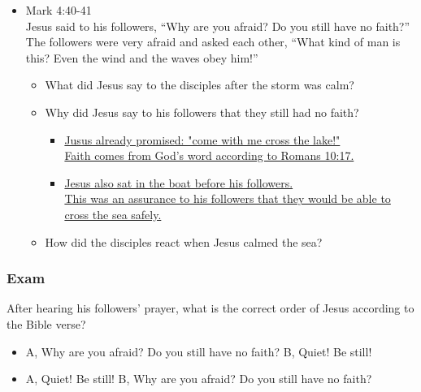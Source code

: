 \begin{itemize}
\item Mark 4:40-41\\Jesus said to his followers, “Why are you afraid? Do you still have no faith?” The followers were very afraid and asked each other, “What kind of man is this? Even the wind and the waves obey him!”
\begin{itemize}
\item What did Jesus say to the disciples after the storm was calm?
\item Why did Jesus say to his followers that they still had no faith?
\begin{itemize}
\item \underline{Jusus already promised: "come with me cross the lake!"}\\
\underline{Faith comes from God's word according to Romans 10:17.} 
\item \underline{Jesus also sat in the boat before his followers.}\\
\underline{This was an assurance to his 
followers that they would be able to cross the sea safely.}
\end{itemize}

\item How did the disciples react when Jesus calmed the sea?
\end{itemize}
\end{itemize}

\subsubsection{Exam}
After hearing his followers' prayer, what is the correct order of Jesus according to the Bible verse?
\begin{itemize}
\item A, Why are you afraid? Do you still have no faith? \hspace{1.cm} B, Quiet! Be still!
\item A, Quiet! Be still! \hspace{1.cm} B, Why are you afraid? Do you still have no faith?
\end{itemize}



